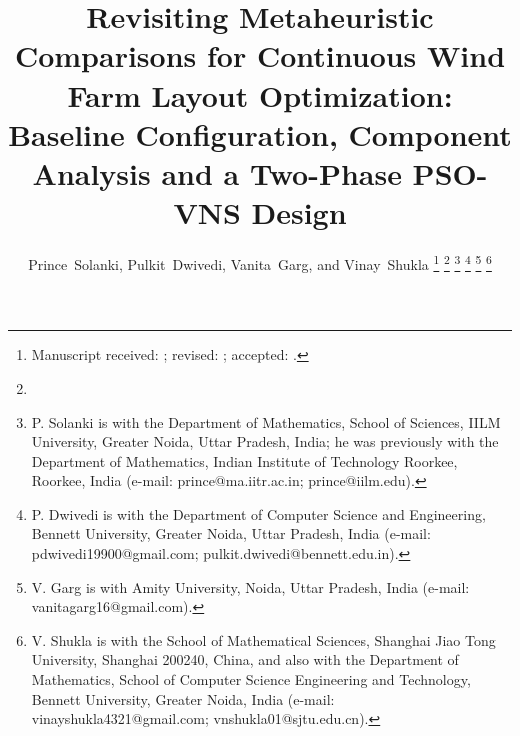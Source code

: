 \title{Revisiting Metaheuristic Comparisons for Continuous Wind Farm Layout Optimization: Baseline Configuration, Component Analysis and a Two-Phase PSO-VNS Design}
\author{Prince~Solanki, Pulkit~Dwivedi, Vanita~Garg, and Vinay~Shukla
\thanks{Manuscript received: ; revised: ; accepted: .}
\thanks{}
\thanks{P. Solanki  is with the Department of Mathematics, School of Sciences, IILM University, Greater Noida, Uttar Pradesh, India; he was previously with the Department of Mathematics, Indian Institute of Technology Roorkee, Roorkee, India (e-mail: prince@ma.iitr.ac.in; prince@iilm.edu).}
\thanks{P. Dwivedi is with the Department of Computer Science and Engineering, Bennett University, Greater Noida, Uttar Pradesh, India (e-mail: pdwivedi19900@gmail.com; pulkit.dwivedi@bennett.edu.in).}
\thanks{V. Garg is with Amity University, Noida, Uttar Pradesh, India (e-mail: vanitagarg16@gmail.com).}
\thanks{V. Shukla is with the School of Mathematical Sciences, Shanghai Jiao Tong University, Shanghai 200240, China, and also with the Department of Mathematics, School of Computer Science Engineering and Technology, Bennett University, Greater Noida, India (e-mail: vinayshukla4321@gmail.com; vnshukla01@sjtu.edu.cn).}}

\maketitle

